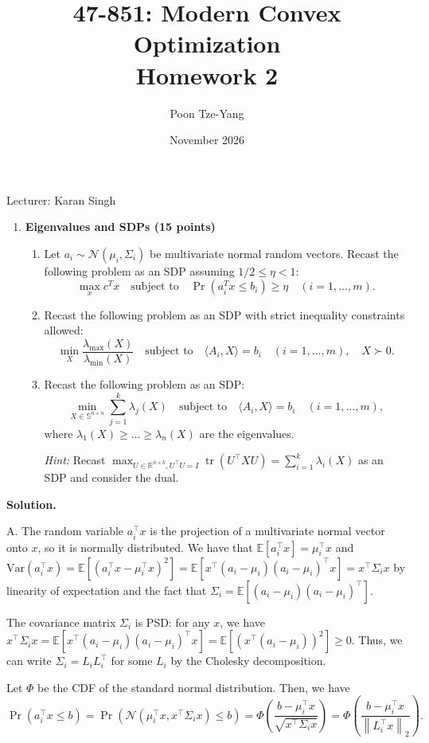\documentclass[11pt,letterpaper]{article}
\title{47-851: Modern Convex Optimization \\ Homework 2}
\author{Poon Tze-Yang}
\date{November 2026}
\theoremstyle{definition}
\newcommand{\reals}{\mathbb{R}}
\newcommand{\calN}{\mathcal{N}}
\newcommand{\EE}{\mathbb{E}}
\newcommand{\Var}{\mathrm{Var}}
\newcommand{\solution}{\medskip\noindent\textbf{Solution.}\par\medskip}
\begin{document}
\maketitle

\noindent Lecturer: Karan Singh

\begin{enumerate}[series=q, start=4]
\item \textbf{Eigenvalues and SDPs (15 points)}
\begin{enumerate}[label=\textbf{Part \Alph*.}, leftmargin=*]
\item Let $a_i \sim \calN(\mu_i, \Sigma_i)$ be multivariate normal random vectors. Recast the following problem as an SDP assuming $1/2 \leq \eta < 1$:
\[
\max_x c^T x \quad \text{subject to} \quad \Pr(a_i^T x \leq b_i) \geq \eta \quad (i = 1, \ldots, m).
\]
\item Recast the following problem as an SDP with strict inequality constraints allowed:
\[
\min_X \frac{\lambda_{\max}(X)}{\lambda_{\min}(X)} \quad \text{subject to} \quad \langle A_i, X \rangle = b_i \quad (i = 1, \ldots, m), \quad X \succ 0.
\]
\item Recast the following problem as an SDP:
\[
\min_{X \in \mathbb{S}^{n \times n}} \sum_{j=1}^k \lambda_j(X) \quad \text{subject to} \quad \langle A_i, X \rangle = b_i \quad (i = 1, \ldots, m),
\]
where $\lambda_1(X) \geq \ldots \geq \lambda_n(X)$ are the eigenvalues.

\emph{Hint:} Recast $\max_{U \in \reals^{n \times k}, U^\top U = I} \operatorname{tr}(U^\top X U) = \sum_{i=1}^k \lambda_i(X)$ as an SDP and consider the dual.
\end{enumerate}
\end{enumerate}

\solution

A.
The random variable $a_i^\top x$ is the projection of a multivariate normal vector onto $x$, so it is normally distributed.
We have that $\EE[a_i^\top x] = \mu_i^\top x$ and $\Var(a^\top_i x) = \EE[(a^\top_i x - \mu_i^\top x)^2]=\EE[x^\top (a_i - \mu_i)(a_i-\mu_i)^\top x] = x^\top \Sigma_i x$ by linearity of expectation and the fact that $\Sigma_i = \EE[(a_i - \mu_i)(a_i - \mu_i)^\top]$.

The covariance matrix $\Sigma_i$ is PSD: for any $x$, we have $x^\top \Sigma_i x = \EE[x^\top (a_i - \mu_i)(a_i-\mu_i)^\top x] = \EE[(x^\top (a_i - \mu_i))^2] \geq 0$.
Thus, we can write $\Sigma_i = L_i L_i^\top$ for some $L_i$ by the Cholesky decomposition.

Let $\Phi$ be the CDF of the standard normal distribution. Then, we have
\[
\Pr(a^\top_i x\leq b) = \Pr(\calN(\mu_i^\top x, x^\top \Sigma_i x) \leq b) = \Phi\left(\frac{b - \mu_i^\top x}{\sqrt{x^\top \Sigma_i x}}\right) = \Phi\left(\frac{b - \mu_i^\top x}{\left\|L_i^\top x\right\|_2}\right).
\]
\end{document}
